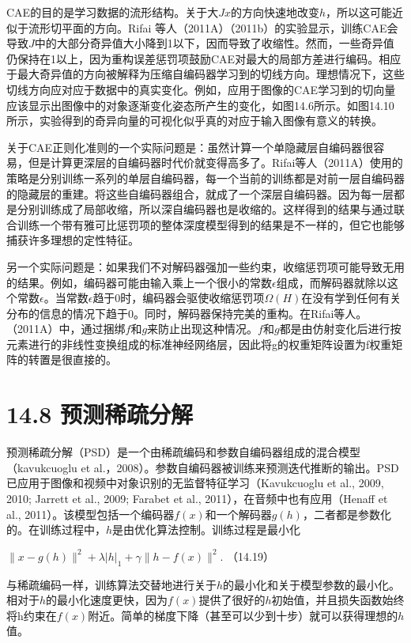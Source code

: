 \documentclass[a4paper,11pt]{book}
\begin{document}
CAE的目的是学习数据的流形结构。关于大$Jx$的方向快速地改变$h$，所以这可能近似于流形切平面的方向。Rifai 等人（2011A）（2011b）的实验显示，训练CAE会导致$J$中的大部分奇异值大小降到1以下，因而导致了收缩性。然而，一些奇异值仍保持在1以上，因为重构误差惩罚项鼓励CAE对最大的局部方差进行编码。相应于最大奇异值的方向被解释为压缩自编码器学习到的切线方向。理想情况下，这些切线方向应对应于数据中的真实变化。例如，应用于图像的CAE学习到的切向量应该显示出图像中的对象逐渐变化姿态所产生的变化，如图14.6所示。如图14.10所示，实验得到的奇异向量的可视化似乎真的对应于输入图像有意义的转换。

关于CAE正则化准则的一个实际问题是：虽然计算一个单隐藏层自编码器很容易，但是计算更深层的自编码器时代价就变得高多了。Rifai等人（2011A）使用的策略是分别训练一系列的单层自编码器，每一个当前的训练都是对前一层自编码器的隐藏层的重建。将这些自编码器组合，就成了一个深层自编码器。因为每一层都是分别训练成了局部收缩，所以深自编码器也是收缩的。这样得到的结果与通过联合训练一个带有雅可比惩罚项的整体深度模型得到的结果是不一样的，但它也能够捕获许多理想的定性特征。


另一个实际问题是：如果我们不对解码器强加一些约束，收缩惩罚项可能导致无用的结果。例如，编码器可能由输入乘上一个很小的常数$\epsilon$组成，而解码器就除以这个常数$\epsilon$。当常数$\epsilon$趋于0时，编码器会驱使收缩惩罚项$\Omega(H)$在没有学到任何有关分布的信息的情况下趋于0。同时，解码器保持完美的重构。在Rifai等人。（2011A）中，通过捆绑$f$和$g$来防止出现这种情况。$f$和$g$都是由仿射变化后进行按元素进行的非线性变换组成的标准神经网络层，因此将g的权重矩阵设置为f权重矩阵的转置是很直接的。

\section{14.8 预测稀疏分解}
预测稀疏分解（PSD）是一个由稀疏编码和参数自编码器组成的混合模型（kavukcuoglu et al.，2008）。参数自编码器被训练来预测迭代推断的输出。PSD已应用于图像和视频中对象识别的无监督特征学习（Kavukcuoglu et al., 2009, 2010; Jarrett et al., 2009; Farabet et al., 2011），在音频中也有应用（Henaff et al., 2011）。该模型包括一个编码器$f(x)$和一个解码器$g(h)$，二者都是参数化的。在训练过程中，$h$是由优化算法控制。训练过程是最小化

\begin{math}
 \| x - g(h) \| ^2 + \lambda | h |_1 + \gamma \| h - f(x) \|^2.
\end{math}
（14.19）

与稀疏编码一样，训练算法交替地进行关于$h$的最小化和关于模型参数的最小化。相对于$h$的最小化速度更快，因为$f(x)$提供了很好的$h$初始值，并且损失函数始终将h约束在$f(x)$附近。简单的梯度下降（甚至可以少到十步）就可以获得理想的$h$值。
\end{document}
